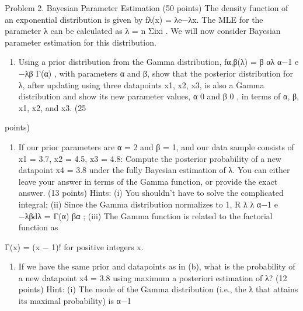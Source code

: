 \documentclass[
  letterpaper,
  DIV=11,
  numbers=noendperiod]{scrartcl}
\providecommand{\tightlist}{%
  \setlength{\itemsep}{0pt}\setlength{\parskip}{0pt}}\usepackage{longtable,booktabs,array}
\begin{document}
\newpage{}

Problem 2. Bayesian Parameter Estimation (50 points) The density
function of an exponential distribution is given by fλ(x) = λe−λx. The
MLE for the parameter λ can be calculated as λ = n Σixi . We will now
consider Bayesian parameter estimation for this distribution.

\begin{enumerate}
\def\labelenumi{(\alph{enumi})}
\tightlist
\item
  Using a prior distribution from the Gamma distribution, fα,β(λ) = β αλ
  α−1 e −λβ Γ(α) , with parameters α and β, show that the posterior
  distribution for λ, after updating using three datapoints x1, x2, x3,
  is also a Gamma distribution and show its new parameter values, α 0
  and β 0 , in terms of α, β, x1, x2, and x3. (25
\end{enumerate}

points)

\newpage{}

\begin{enumerate}
\def\labelenumi{(\alph{enumi})}
\setcounter{enumi}{1}
\tightlist
\item
  If our prior parameters are α = 2 and β = 1, and our data sample
  consists of x1 = 3.7, x2 = 4.5, x3 = 4.8: Compute the posterior
  probability of a new datapoint x4 = 3.8 under the fully Bayesian
  estimation of λ. You can either leave your answer in terms of the
  Gamma function, or provide the exact answer. (13 points) Hints: (i)
  You shouldn't have to solve the complicated integral; (ii) Since the
  Gamma distribution normalizes to 1, R λ λ α−1 e −λβdλ = Γ(α) βα ;
  (iii) The Gamma function is related to the factorial function as
\end{enumerate}

Γ(x) = (x − 1)! for positive integers x.

\newpage{}

\begin{enumerate}
\def\labelenumi{(\alph{enumi})}
\setcounter{enumi}{2}
\tightlist
\item
  If we have the same prior and datapoints as in (b), what is the
  probability of a new datapoint x4 = 3.8 using maximum a posteriori
  estimation of λ? (12 points) Hint: (i) The mode of the Gamma
  distribution (i.e., the λ that attains its maximal probability) is α−1
\end{enumerate}
\end{document}
